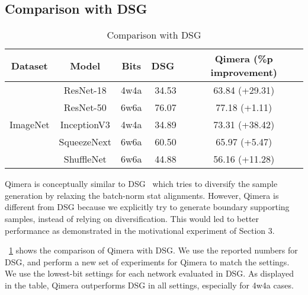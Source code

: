 \documentclass{article}
\newcommand{\aname}{Qimera\xspace}
\newcommand{\rev}[1]{{\color{olivegreen}#1}}
\renewcommand{\rev}[1]{#1}
\begin{document}
\rev{
\subsection{Comparison with DSG}

\begin{table}[h]
\rev{
    \centering    
    \caption{Comparison with DSG}
    \label{tab:dsg}
    
{
    \begin{tabular}{ccccc}
    \toprule
    Dataset & Model & Bits & DSG~\cite{zhang2021diversifying} & Qimera (\%p improvement)\\ 
      \midrule

       \multirow{5}{*}{ImageNet} &   ResNet-18 & 4w4a &	34.53	& 63.84 (+29.31) \\
                                 &   ResNet-50 & 6w6a &	76.07 &	77.18 (+1.11) \\
                                 &   InceptionV3 & 4w4a &	34.89	& 73.31 (+38.42) \\
                                 &   SqueezeNext & 6w6a &	60.50 &	65.97 (+5.47) \\
                                 &   ShuffleNet & 6w6a &	44.88   &	56.16 (+11.28) \\
      
               \bottomrule
          \end{tabular}}
          }
\end{table}

\aname is conceptually similar to DSG~\cite{zhang2021diversifying} which tries to diversify the sample generation by relaxing the batch-norm stat alignments.
However, \aname is different from DSG because we explicitly try to generate boundary supporting samples, instead of relying on diversification.
This would led to better performance as demonstrated in the motivational experiment of Section 3.

\tablename~\ref{tab:dsg} shows the comparison of \aname with DSG.
We use the reported numbers for DSG, and perform a new set of experiments for \aname to match the settings.
We use the lowest-bit settings for each network evaluated in DSG.
As displayed in the table, \aname outperforms DSG in all settings, especially for 4w4a cases.
}
\end{document}
